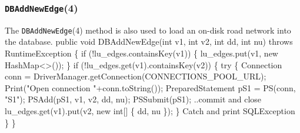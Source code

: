 \documentclass{article}
\def\nwendcode{\endtrivlist \endgroup}      %
\let\nwdocspar=\par
\theoremstyle{definition}                   %
\begin{document}
\subsubsection{{\tt{}\protect{}DBAddNewEdge}(4)}
The {\tt{}\protect{}DBAddNewEdge}(4) method is also used to load an on-disk road network
into the database.
\nwenddocs{}\endmoddef{}
public void DBAddNewEdge(int v1, int v2, int dd, int nu) throws RuntimeException \{
  if (!lu_edges.containsKey(v1)) \{
    lu_edges.put(v1, new HashMap<>());
  \}
  if (!lu_edges.get(v1).containsKey(v2)) \{
    try \{
      Connection conn = DriverManager.getConnection(CONNECTIONS_POOL_URL);
      Print("Open connection "+conn.toString());
      PreparedStatement pS1 = PS(conn, "S1");
      PSAdd(pS1, v1, v2, dd, nu);
      PSSubmit(pS1);
      \LA{}..commit and close~{\nwtagstyle{}}\RA{}
      lu_edges.get(v1).put(v2, new int[] \{ dd, nu \});
    \}
    \LA{}Catch and print \code{}SQLException\edoc{}~{\nwtagstyle{}}\RA{}
  \}
\}
\eatline
{}\nwendcode{}\nwdocspar
\end{document}
